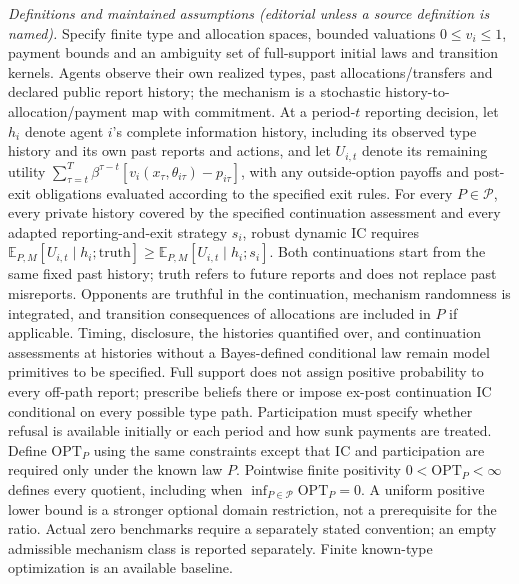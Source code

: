 \documentclass[11pt,a4paper]{article}
\begin{document}
\emph{Definitions and maintained assumptions (editorial unless a source definition is named).} Specify finite type and allocation spaces, bounded valuations \(0\le v_i\le1\), payment bounds and an ambiguity set of full-support initial laws and transition kernels. Agents observe their own realized types, past allocations/transfers and declared public report history; the mechanism is a stochastic history-to-allocation/payment map with commitment. At a period-\(t\) reporting decision, let \(h_i\) denote agent \(i\)'s complete information history, including its observed type history and its own past reports and actions, and let \(U_{i,t}\) denote its remaining utility \(\sum_{\tau=t}^T\beta^{\tau-t}[v_i(x_\tau,\theta_{i\tau})-p_{i\tau}]\), with any outside-option payoffs and post-exit obligations evaluated according to the specified exit rules. For every \(P\in\mathcal P\), every private history covered by the specified continuation assessment and every adapted reporting-and-exit strategy \(s_i\), robust dynamic IC requires \(\mathbb E_{P,M}[U_{i,t}\mid h_i;\mathrm{truth}]\ge\mathbb E_{P,M}[U_{i,t}\mid h_i;s_i]\). Both continuations start from the same fixed past history; truth refers to future reports and does not replace past misreports. Opponents are truthful in the continuation, mechanism randomness is integrated, and transition consequences of allocations are included in \(P\) if applicable. Timing, disclosure, the histories quantified over, and continuation assessments at histories without a Bayes-defined conditional law remain model primitives to be specified. Full support does not assign positive probability to every off-path report; prescribe beliefs there or impose ex-post continuation IC conditional on every possible type path. Participation must specify whether refusal is available initially or each period and how sunk payments are treated. Define \(\mathrm{OPT}_P\) using the same constraints except that IC and participation are required only under the known law \(P\). Pointwise finite positivity \(0<\mathrm{OPT}_P<\infty\) defines every quotient, including when \(\inf_{P\in\mathcal P}\mathrm{OPT}_P=0\). A uniform positive lower bound is a stronger optional domain restriction, not a prerequisite for the ratio. Actual zero benchmarks require a separately stated convention; an empty admissible mechanism class is reported separately. Finite known-type optimization is an available baseline.
\end{document}
